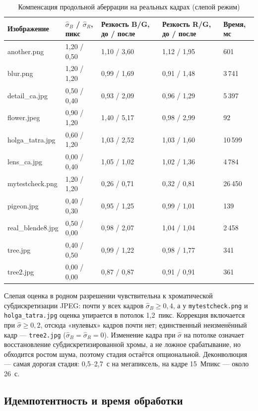 \documentclass[a4paper,14pt,oneside]{extreport}
\begin{document}
\begin{table}[H]
\caption{Компенсация продольной аберрации на реальных кадрах (слепой
режим)}
\label{tab:axial_real}
\small
\begin{tabular}{|p{3.0cm}|p{2.4cm}|p{2.7cm}|p{2.7cm}|p{1.7cm}|}
\hline
Изображение & $\hat\sigma_B$ / $\hat\sigma_R$, пикс & Резкость B/G, до / после & Резкость R/G, до / после & Время, мс \\
\hline
another.png & 1,20 / 0,50 & 1,10 / 3,60 & 1,12 / 1,95 & 601 \\
\hline
blur.png & 1,20 / 1,20 & 0,99 / 1,69 & 0,91 / 1,48 & 3\,741 \\
\hline
detail\_ca.jpg & 0,50 / 0,40 & 0,93 / 2,09 & 0,96 / 1,29 & 5\,397 \\
\hline
flower.jpeg & 0,90 / 1,20 & 1,40 / 5,17 & 0,98 / 2,99 & 92 \\
\hline
holga\_tatra.jpg & 0,60 / 1,20 & 1,03 / 2,52 & 1,03 / 1,60 & 10\,599 \\
\hline
lens\_ca.jpg & 0,00 / 0,40 & 1,05 / 1,02 & 1,02 / 1,36 & 4\,784 \\
\hline
mytestcheck.png & 1,20 / 1,20 & 0,26 / 0,71 & 0,32 / 0,81 & 26\,450 \\
\hline
pigeon.jpg & 0,40 / 0,30 & 0,95 / 1,25 & 0,99 / 1,01 & 139 \\
\hline
real\_blende8.jpg & 0,50 / 0,00 & 0,98 / 2,07 & 1,04 / 1,04 & 2\,458 \\
\hline
tree.jpg & 0,40 / 0,50 & 0,99 / 1,22 & 0,98 / 1,77 & 341 \\
\hline
tree2.jpg & 0,00 / 0,00 & 0,87 / 0,87 & 0,91 / 0,91 & 361 \\
\hline
\end{tabular}
\end{table}

Слепая оценка в родном разрешении чувствительна к хроматической
субдискретизации JPEG: почти у всех кадров $\hat\sigma_B\ge0{,}4$, а у
\texttt{mytestcheck.png} и \texttt{holga\_tatra.jpg} оценка упирается в
потолок 1{,}2~пикс. Коррекция включается при $\hat\sigma\ge0{,}2$, отсюда
«нулевых» кадров почти нет; единственный неизменённый кадр ---
\texttt{tree2.jpg} ($\hat\sigma_B=\hat\sigma_R=0$). Изменение кадра при
$\hat\sigma$ на потолке означает восстановление субдискретизированной
хромы, а не ложное срабатывание, но обходится ростом шума, поэтому стадия
остаётся опциональной. Деконволюция --- самая дорогая
стадия: 0,5--2,7~с на мегапиксель, на кадре 15~Мпикс --- около 26~с.

\subsection{Идемпотентность и время обработки}
\end{document}
